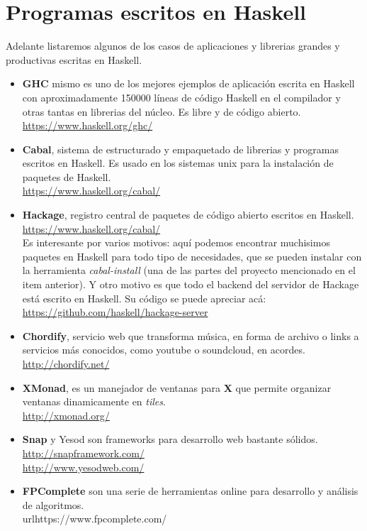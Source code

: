 \section{Programas escritos en Haskell} %
\label{sec:casos_de_uso}

Adelante listaremos algunos de los casos de aplicaciones y librerias grandes y productivas escritas en Haskell.

\begin{itemize}
  \item \textbf{GHC} mismo es uno de los mejores ejemplos de aplicación escrita en Haskell con aproximadamente 150000 líneas de código Haskell en el compilador y otras tantas en librerias del núcleo. Es libre y de código abierto.
  \\ \url{https://www.haskell.org/ghc/}

  \item \textbf{Cabal}, sistema de estructurado y empaquetado de librerias y programas escritos en Haskell. Es usado en los sistemas unix para la instalación de paquetes de Haskell.\\
  \url{https://www.haskell.org/cabal/}

  \item \textbf{Hackage}, registro central de paquetes de código abierto escritos en Haskell. \\
  \url{https://www.haskell.org/cabal/} \\
  Es interesante por varios motivos: aquí podemos encontrar muchisimos paquetes en Haskell para todo tipo de necesidades, que se pueden instalar con la herramienta \textit{cabal-install} (una de las partes del proyecto mencionado en el item anterior). Y otro motivo es que todo el backend del servidor de Hackage está escrito en Haskell. Su código se puede apreciar acá: \\ \url{https://github.com/haskell/hackage-server}

  \item \textbf{Chordify}, servicio web que transforma música, en forma de archivo o links a servicios más conocidos, como youtube o soundcloud, en acordes. \\ \url{http://chordify.net/}

  \item \textbf{XMonad}, es un manejador de ventanas para \textbf{X} que permite organizar ventanas dinamicamente en \textit{tiles}. \\ \url{http://xmonad.org/}

  \item \textbf{Snap} y Yesod son frameworks para desarrollo web bastante sólidos.
  \\ \url{http://snapframework.com/}
  \\ \url{http://www.yesodweb.com/}

  \item \textbf{FPComplete} son una serie de herramientas online para desarrollo y análisis de algoritmos. \\ url{https://www.fpcomplete.com/}
  \end{itemize}


